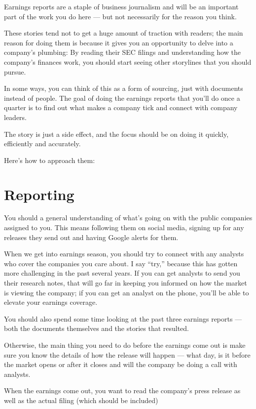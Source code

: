 \documentclass[
  12pt,
  american,
  letterpaperpaper,
  extrafontsizes,onecolumn,openright
  ]{memoir}
\begin{document}
Earnings reports are a staple of business journalism and will be an important part of the work you do here --- but not necessarily for the reason you think.

These stories tend not to get a huge amount of traction with readers; the main reason for doing them is because it gives you an opportunity to delve into a company's plumbing: By reading their SEC filings and understanding how the company's finances work, you should start seeing other storylines that you should pursue.

In some ways, you can think of this as a form of sourcing, just with documents instead of people. The goal of doing the earnings reports that you'll do once a quarter is to find out what makes a company tick and connect with company leaders.

The story is just a side effect, and the focus should be on doing it quickly, efficiently and accurately.

Here's how to approach them:

\hypertarget{reporting}{%
\section*{Reporting}\label{reporting}}

You should a general understanding of what's going on with the public companies assigned to you. This means following them on social media, signing up for any releases they send out and having Google alerts for them.

When we get into earnings season, you should try to connect with any analysts who cover the companies you care about. I say \enquote{try,} because this has gotten more challenging in the past several years. If you can get analysts to send you their research notes, that will go far in keeping you informed on how the market is viewing the company; if you can get an analyst on the phone, you'll be able to elevate your earnings coverage.

You should also spend some time looking at the past three earnings reports --- both the documents themselves and the stories that resulted.

Otherwise, the main thing you need to do before the earnings come out is make sure you know the details of how the release will happen --- what day, is it before the market opens or after it closes and will the company be doing a call with analysts.

When the earnings come out, you want to read the company's press release as well as the actual filing (which should be included)
\end{document}
